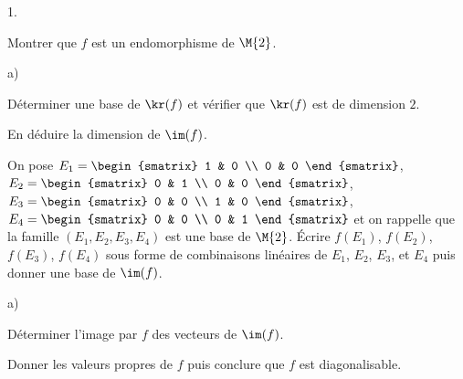 \documentclass[11pt]{article}%
\begin{document}
\begin{noliste}{1.}
  \setlength{\itemsep}{4mm} %
  \setcounter{enumi}{2}
\item Montrer que $f$ est un endomorphisme de $\M{2}$.

  
  



\item 
  \begin{noliste}{a)}
    \setlength{\itemsep}{2mm}
  \item Déterminer une base de $\kr(f)$ et vérifier que $\kr(f)$ est
    de dimension $2$.

    




  \item En déduire la dimension de $\im(f)$.

    

  \item On pose $E_1 =
    \begin{smatrix}
      1 & 0 \\
      0 & 0
    \end{smatrix}
    $, $E_2 =
    \begin{smatrix}
      0 & 1 \\
      0 & 0
    \end{smatrix}
    $, $E_3 =
    \begin{smatrix}
      0 & 0 \\
      1 & 0
    \end{smatrix}
    $, $E_4 =
    \begin{smatrix}
      0 & 0 \\
      0 & 1
    \end{smatrix}
    $ et on rappelle que la famille $(E_1, E_2, E_3, E_4)$ est une
    base de $\M{2}$. Écrire $f(E_1)$, $f(E_2)$, $f(E_3)$, $f(E_4)$
    sous forme de combinaisons linéaires de $E_1$, $E_2$, $E_3$, et
    $E_4$ puis donner une base de $\im(f)$.
    
  \end{noliste}

\item 
  \begin{noliste}{a)}
    \setlength{\itemsep}{2mm}
  \item Déterminer l'image par $f$ des vecteurs de $\im(f)$.

    

  \item Donner les valeurs propres de $f$ puis conclure que $f$ est
    diagonalisable.


\end{noliste}
\end{noliste}
\end{document}

